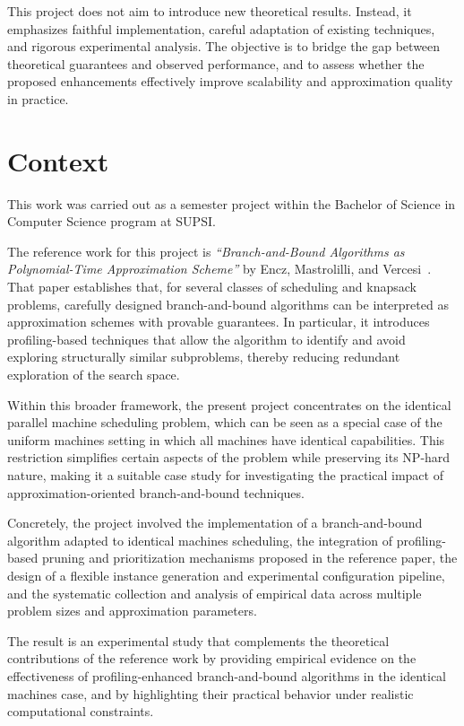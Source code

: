 This project does not aim to introduce new theoretical results.
Instead, it emphasizes faithful implementation, careful adaptation of existing techniques, and rigorous experimental analysis.
The objective is to bridge the gap between theoretical guarantees and observed performance, and to assess whether the proposed enhancements effectively improve scalability and approximation quality in practice.

\section{Context}
\label{sec:context}

This work was carried out as a semester project within the Bachelor of Science in Computer Science program at SUPSI.

The reference work for this project is \emph{``Branch-and-Bound Algorithms as Polynomial-Time Approximation Scheme''} by Encz, Mastrolilli, and Vercesi~\cite{bb-ptas}.
That paper establishes that, for several classes of scheduling and knapsack problems, carefully designed branch-and-bound algorithms can be interpreted as approximation schemes with provable guarantees.
In particular, it introduces profiling-based techniques that allow the algorithm to identify and avoid exploring structurally similar subproblems, thereby reducing redundant exploration of the search space.

Within this broader framework, the present project concentrates on the identical parallel machine scheduling problem, which can be seen as a special case of the uniform machines setting in which all machines have identical capabilities.
This restriction simplifies certain aspects of the problem while preserving its NP-hard nature, making it a suitable case study for investigating the practical impact of approximation-oriented branch-and-bound techniques.

Concretely, the project involved the implementation of a branch-and-bound algorithm adapted to identical machines scheduling, the integration of profiling-based pruning and prioritization mechanisms proposed in the reference paper, the design of a flexible instance generation and experimental configuration pipeline, and the systematic collection and analysis of empirical data across multiple problem sizes and approximation parameters.

The result is an experimental study that complements the theoretical contributions of the reference work by providing empirical evidence on the effectiveness of profiling-enhanced branch-and-bound algorithms in the identical machines case, and by highlighting their practical behavior under realistic computational constraints.
